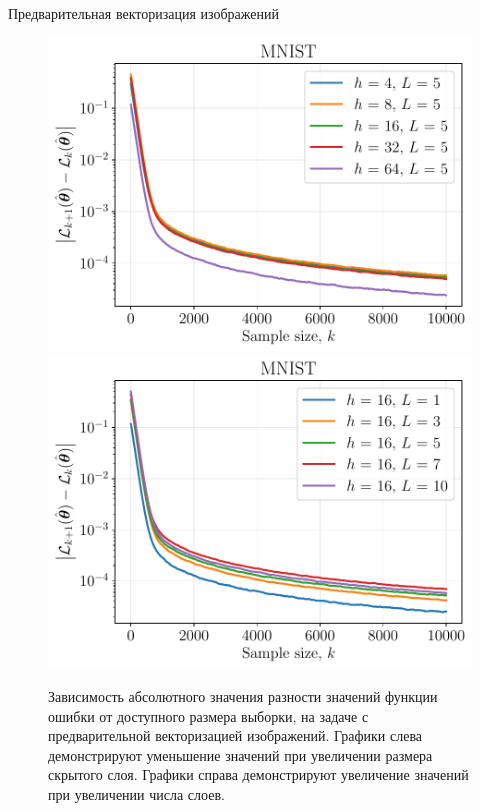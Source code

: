 \documentclass[aspectratio=169]{beamer}
\begin{document}
\begin{frame}{Предварительная векторизация изображений}
    \begin{figure}[ht]
        \centering
        \includegraphics[width=0.5\linewidth]{../paper/figs_extraction/mnist_hidden_size.pdf}\hfill
        \includegraphics[width=0.5\linewidth]{../paper/figs_extraction/mnist_num_layers.pdf}
        \caption{Зависимость абсолютного значения разности значений функции ошибки от доступного размера выборки, на задаче с предварительной векторизацией изображений. Графики слева демонстрируют уменьшение значений при увеличении размера скрытого слоя. Графики справа демонстрируют увеличение значений при увеличении числа слоев.}
    \end{figure}
\end{frame}
\end{document}
